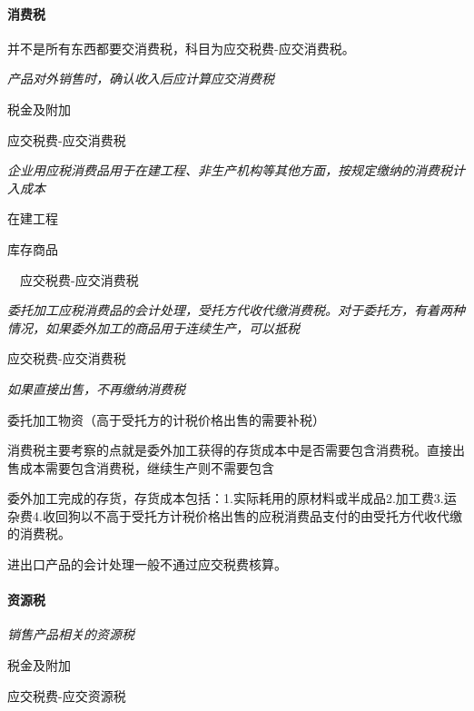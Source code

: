 \documentclass[UTF8,12pt]{ctexart}
\newenvironment{Dr}{%
	\begin{list}{}%
		{
			\setlength{\leftmargin}{2em}
			\setlength{\labelwidth}{2em}
			\setlength{\labelsep}{0pt}
			\setlength{\itemindent}{0pt}
			\setlength{\listparindent}{0pt}
			\setlength{\parsep}{0pt}
			\setlength{\topsep}{0pt}
		}
		\item[\textbf{借：}]
	}{%
	\end{list}
}
\newenvironment{Cr}{%
	\begin{list}{}%
		{
			\setlength{\leftmargin}{2em}
			\setlength{\labelwidth}{2em}
			\setlength{\labelsep}{0pt}
			\setlength{\itemindent}{0pt}
			\setlength{\listparindent}{0pt}
			\setlength{\parsep}{0pt}
			\setlength{\topsep}{0pt}
		}
		\item[\textbf{贷：}]
	}{%
	\end{list}
}
\numberwithin{equation}{section} %
\numberwithin{figure}{section}
\numberwithin{table}{section}
\begin{document}
	\paragraph{消费税}
	并不是所有东西都要交消费税，科目为应交税费-应交消费税。
	
	\textit{产品对外销售时，确认收入后应计算应交消费税}
	
	\begin{Dr}
		税金及附加
	\end{Dr}
	\begin{Cr}
		应交税费-应交消费税
	\end{Cr}

	\textit{企业用应税消费品用于在建工程、非生产机构等其他方面，按规定缴纳的消费税计入成本}
	
	\begin{Dr}
		在建工程
	\end{Dr}
	\begin{Cr}
		库存商品
		
		\ \ 应交税费-应交消费税
	\end{Cr}

	\textit{委托加工应税消费品的会计处理，受托方代收代缴消费税。对于委托方，有着两种情况，如果委外加工的商品用于连续生产，可以抵税}
	
	\begin{Dr}
		应交税费-应交消费税
	\end{Dr}

	\textit{如果直接出售，不再缴纳消费税}
	
	\begin{Dr}
		委托加工物资（高于受托方的计税价格出售的需要补税）
	\end{Dr}

	消费税主要考察的点就是委外加工获得的存货成本中是否需要包含消费税。直接出售成本需要包含消费税，继续生产则不需要包含
	
	委外加工完成的存货，存货成本包括：1.实际耗用的原材料或半成品2.加工费3.运杂费4.收回狗以不高于受托方计税价格出售的应税消费品支付的由受托方代收代缴的消费税。
	
	进出口产品的会计处理一般不通过应交税费核算。
	
	\paragraph{资源税}
	\textit{销售产品相关的资源税}
	
	\begin{Dr}
		税金及附加
	\end{Dr}
	\begin{Cr}
		应交税费-应交资源税
	\end{Cr}
	
\end{document}
